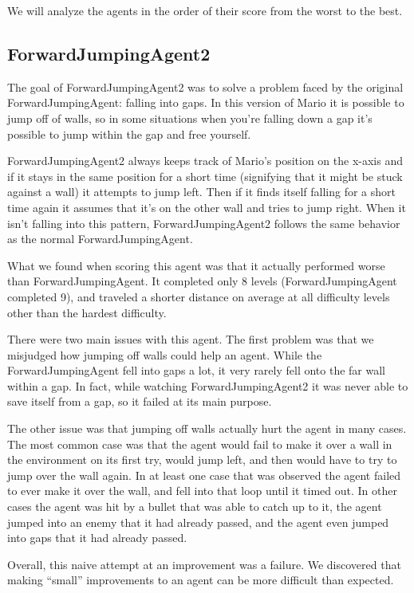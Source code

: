 \documentclass[12pt]{article}
\begin{document}
\begin{multicols*}{2}
We will analyze the agents in the order of their score from the worst to the best.
\subsection*{ForwardJumpingAgent2}
The goal of ForwardJumpingAgent2 was to solve a problem faced by the original 
ForwardJumpingAgent: falling into gaps.  In this version of Mario it is possible to jump off of walls, 
so in some situations when you're falling down a gap it's possible to jump within the gap and free 
yourself.

ForwardJumpingAgent2 always keeps track of Mario's position on the x-axis and if it stays in the 
same position for a short time (signifying that it might be stuck against a wall) it attempts to jump left.  
Then if it finds itself falling for a short time again it assumes that it's on the other wall and tries to jump 
right.  When it isn't falling into this pattern, ForwardJumpingAgent2 follows the same behavior as 
the normal ForwardJumpingAgent.

What we found when scoring this agent was that it actually performed worse than 
ForwardJumpingAgent.  It completed only 8 levels (ForwardJumpingAgent completed 9), and 
traveled a shorter distance on average at all difficulty levels other than the hardest difficulty.

There were two main issues with this agent.  The first problem was that we misjudged how 
jumping off walls could help an agent.  While the ForwardJumpingAgent fell into gaps a lot, 
it very rarely fell onto the far wall within a gap.  In fact, while watching ForwardJumpingAgent2 it was 
never able to save itself from a gap, so it failed at its main purpose.

The other issue was that jumping off walls actually hurt the agent in many cases.  The most common 
case was that the agent would fail to make it over a wall in the environment on its first try, would jump 
left, and then would have to try to jump over the wall again.  In at least one case that was observed the 
agent failed to ever make it over the wall, and fell into that loop until it timed out.  In other cases the 
agent was hit by a bullet that was able to catch up to it, the agent jumped into an enemy that it had 
already passed, and the agent even jumped into gaps that it had already passed.

Overall, this naive attempt at an improvement was a failure.  We discovered that making ``small'' 
improvements to an agent can be more difficult than expected.


\end{multicols*}
\end{document}
